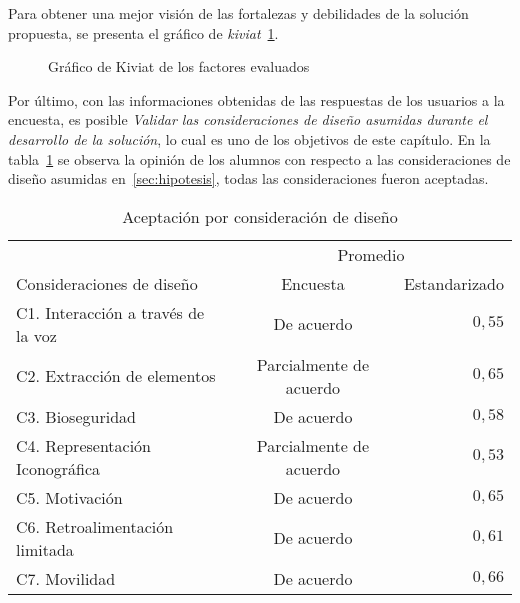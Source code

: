 Para  obtener una mejor visión de las fortalezas y debilidades de la solución
propuesta, se presenta el gráfico de \emph{kiviat}~\ref{fig:subjetiva_kiviat}.

\begin{figure}[H]
\centering
{}
\label{fig:subjetiva_kiviat}
\caption{Gráfico de Kiviat de los factores evaluados}
\end{figure}


Por último, con las informaciones obtenidas de las respuestas de los usuarios a la encuesta, es posible 
\emph{Validar las consideraciones de diseño asumidas
    durante el desarrollo de la solución}, lo cual es uno de los objetivos de
este capítulo. En la tabla~\ref{tab:resultado_resumen_hipotesis} se observa la
opinión de los alumnos con respecto a las consideraciones de diseño asumidas
en~\ref{sec:hipotesis}, todas las consideraciones fueron aceptadas.


\begin{table}[H]
\centering
\begin{tabular}{lcr}
\toprule
& \multicolumn{2}{c}{Promedio} \\
\cmidrule(lr){2-3}
Consideraciones de diseño          & Encuesta                & Estandarizado \\
\midrule
C1. Interacción a través de la voz & De acuerdo              & $0,55$ \\
C2. Extracción de elementos        & Parcialmente de acuerdo & $0,65$ \\
C3. Bioseguridad                   & De acuerdo              & $0,58$ \\
C4. Representación Iconográfica    & Parcialmente de acuerdo & $0,53$ \\
C5. Motivación                     & De acuerdo              & $0,65$ \\
C6. Retroalimentación limitada     & De acuerdo              & $0,61$ \\
C7. Movilidad                      & De acuerdo              & $0,66$ \\
\bottomrule
\end{tabular}
\caption{Aceptación por consideración de diseño}
\label{tab:resultado_resumen_hipotesis}
\end{table}


